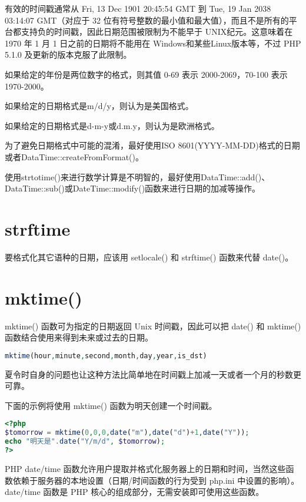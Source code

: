 有效的时间戳通常从 Fri, 13 Dec 1901 20:45:54 GMT 到 Tue, 19 Jan 2038 03:14:07 GMT（对应于 32 位有符号整数的最小值和最大值），而且不是所有的平台都支持负的时间戳，因此日期范围被限制为不能早于 UNIX纪元。这意味着在 1970 年 1 月 1 日之前的日期将不能用在 Windows和某些Linux版本等，不过 PHP 5.1.0 及更新的版本克服了此限制。

\begin{compactitem}
\item 如果给定的年份是两位数字的格式，则其值 0-69 表示 2000-2069，70-100 表示 1970-2000。
\item 如果给定的日期格式是m/d/y，则认为是美国格式。
\item 如果给定的日期格式是d-m-y或d.m.y，则认为是欧洲格式。
\end{compactitem}

为了避免日期格式中可能的混淆，最好使用ISO 8601(YYYY-MM-DD)格式的日期或者DataTime::createFromFormat()。

使用strtotime()来进行数学计算是不明智的，最好使用DataTime::add()、DataTime::sub()或DateTime::modify()函数来进行日期的加减等操作。

\section{strftime}

要格式化其它语种的日期，应该用 setlocale() 和 strftime() 函数来代替 date()。


\section{mktime()}


mktime() 函数可为指定的日期返回 Unix 时间戳，因此可以把 date() 和 mktime() 函数结合使用来得到未来或过去的日期。


\begin{lstlisting}[language=PHP]
mktime(hour,minute,second,month,day,year,is_dst)
\end{lstlisting}

夏令时自身的问题也让这种方法比简单地在时间戳上加减一天或者一个月的秒数更可靠。


下面的示例将使用 mktime() 函数为明天创建一个时间戳。


\begin{lstlisting}[language=PHP]
<?php
$tomorrow = mktime(0,0,0,date("m"),date("d")+1,date("Y"));
echo "明天是".date("Y/m/d", $tomorrow);
?>
\end{lstlisting}

PHP date/time 函数允许用户提取并格式化服务器上的日期和时间，当然这些函数依赖于服务器的本地设置（日期/时间函数的行为受到 php.ini 中设置的影响）。date/time 函数是 PHP 核心的组成部分，无需安装即可使用这些函数。


